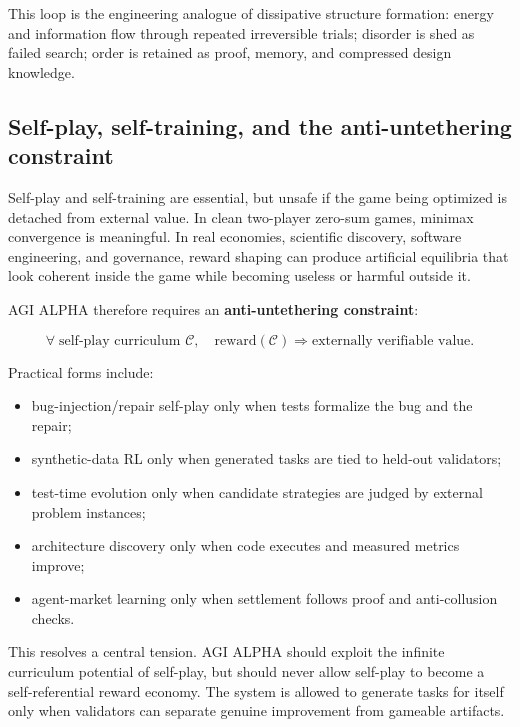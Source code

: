 \documentclass[11pt]{article}
\providecommand{\tightlist}{\setlength{\itemsep}{0pt}\setlength{\parskip}{0pt}}
\begin{document}
This loop is the engineering analogue of dissipative structure
formation: energy and information flow through repeated irreversible
trials; disorder is shed as failed search; order is retained as proof,
memory, and compressed design knowledge.

\subsection{Self-play, self-training, and the anti-untethering
constraint}\label{self-play-self-training-and-the-anti-untethering-constraint}

Self-play and self-training are essential, but unsafe if the game being
optimized is detached from external value. In clean two-player zero-sum
games, minimax convergence is meaningful. In real economies, scientific
discovery, software engineering, and governance, reward shaping can
produce artificial equilibria that look coherent inside the game while
becoming useless or harmful outside it.

AGI ALPHA therefore requires an \textbf{anti-untethering constraint}:

\[
\forall \; \text{self-play curriculum } \mathcal{C},
\quad
\text{reward}(\mathcal{C})
\Rightarrow
\text{externally verifiable value}.
\]

Practical forms include:

\begin{itemize}
\tightlist
\item
  bug-injection/repair self-play only when tests formalize the bug and
  the repair;
\item
  synthetic-data RL only when generated tasks are tied to held-out
  validators;
\item
  test-time evolution only when candidate strategies are judged by
  external problem instances;
\item
  architecture discovery only when code executes and measured metrics
  improve;
\item
  agent-market learning only when settlement follows proof and
  anti-collusion checks.
\end{itemize}

This resolves a central tension. AGI ALPHA should exploit the infinite
curriculum potential of self-play, but should never allow self-play to
become a self-referential reward economy. The system is allowed to
generate tasks for itself only when validators can separate genuine
improvement from gameable artifacts.
\end{document}
